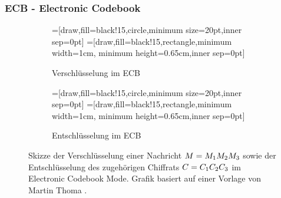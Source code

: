 \subsubsection{ECB - Electronic Codebook}
\begin{figure}[h]
	\centering
	\begin{subfigure}[h]{.45\textwidth}
		\centering
		=[draw,fill=black!15,circle,minimum size=20pt,inner sep=0pt]
		=[draw,fill=black!15,rectangle,minimum width=1cm, minimum height=0.65cm,inner sep=0pt]
		\caption{Verschlüsselung im ECB}
	\end{subfigure}
	\hfill
	\begin{subfigure}[h]{.45\textwidth}
		\centering
		=[draw,fill=black!15,circle,minimum size=20pt,inner sep=0pt]
		=[draw,fill=black!15,rectangle,minimum width=1cm, minimum height=0.65cm,inner sep=0pt]
		\caption{Entschlüsselung im ECB}
	\end{subfigure}
	\caption{Skizze der Verschlüsselung einer Nachricht $M = M_1 M_2 M_3$ sowie der Entschlüsselung des zugehörigen Chiffrats $C = C_1 C_2 C_3$ im
	Electronic Codebook Mode. Grafik basiert auf einer Vorlage von Martin Thoma \cite{Thoma2013}.}
\end{figure}

